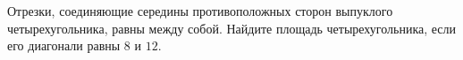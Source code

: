 \begin{ex}
	\begin{condition}
		Отрезки, соединяющие середины противоположных сторон выпуклого четырехугольника, равны между собой. Найдите площадь четырехугольника, если его диагонали равны	\( 8  \) и \( 12 \).
	\end{condition}
\end{ex}